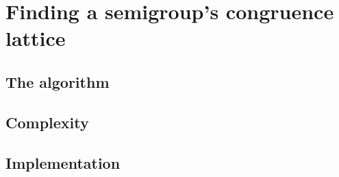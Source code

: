 \chapter{Finding a semigroup's congruence lattice}
\label{chap:lattice}

\lipsum[3]

\section{The algorithm}

\section{Complexity}

\section{Implementation}
